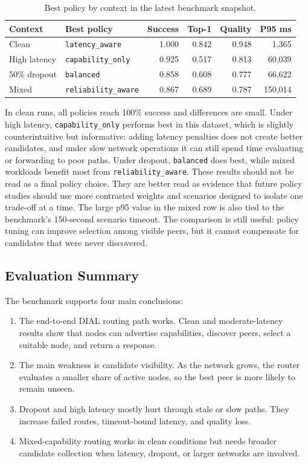 \begin{table}[H]
\centering
\caption{Best policy by context in the latest benchmark snapshot.}
\begin{tabular}{llrrrr}
\toprule
\textbf{Context} & \textbf{Best policy} & \textbf{Success} & \textbf{Top-1} & \textbf{Quality} & \textbf{P95 ms} \\
\midrule
Clean & \texttt{latency\_aware} & 1.000 & 0.842 & 0.948 & 1,365 \\
High latency & \texttt{capability\_only} & 0.925 & 0.517 & 0.813 & 60,039 \\
50\% dropout & \texttt{balanced} & 0.858 & 0.608 & 0.777 & 66,622 \\
Mixed & \texttt{reliability\_aware} & 0.867 & 0.689 & 0.787 & 150,014 \\
\bottomrule
\end{tabular}
\end{table}

In clean runs, all policies reach 100\% success and differences are small. Under
high latency, \texttt{capability\_only} performs best in this dataset, which is
slightly counterintuitive but informative: adding latency penalties does not
create better candidates, and under slow network operations it can still spend
time evaluating or forwarding to poor paths. Under dropout, \texttt{balanced}
does best, while mixed workloads benefit most from \texttt{reliability\_aware}.
These results should not be read as a final policy choice. They are better read
as evidence that future policy studies should use more contrasted weights and
scenarios designed to isolate one trade-off at a time. The large p95 value in
the mixed row is also tied to the benchmark's 150-second scenario timeout.
The comparison is still useful: policy tuning can improve selection among
visible peers, but it cannot compensate for candidates that were never
discovered.

\subsection{Evaluation Summary}

The benchmark supports four main conclusions:

\begin{enumerate}
  \item The end-to-end DIAL routing path works. Clean and moderate-latency
  results show that nodes can advertise capabilities, discover peers, select a
  suitable node, and return a response.
  \item The main weakness is candidate visibility. As the network grows, the
  router evaluates a smaller share of active nodes, so the best peer is more
  likely to remain unseen.
  \item Dropout and high latency mostly hurt through stale or slow paths. They
  increase failed routes, timeout-bound latency, and quality loss.
  \item Mixed-capability routing works in clean conditions but needs broader
  candidate collection when latency, dropout, or larger networks are involved.
\end{enumerate}

